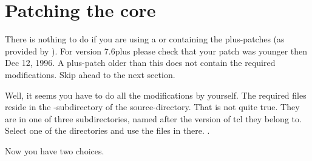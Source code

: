 \documentclass {report}
\begin{document}
\chapter  {Patching the core}\label {scalpel}

There is nothing to do if you are using a \tclsh{} or \wish{}
containing the plus-patches (as provided by \jan). For version 7.6plus
please check that your patch was younger then Dec 12, 1996. A
plus-patch older than this does not contain the required
modifications. Skip ahead to the next section.


Well, it seems you have to do all the modifications by yourself. The
required files reside in the -subdirectory of the
source-directory. That is not quite true. They are in one of three
subdirectories, named after the version of tcl they belong to. Select
one of the directories and use the files in there. .

Now you have two choices.
\end{document}
